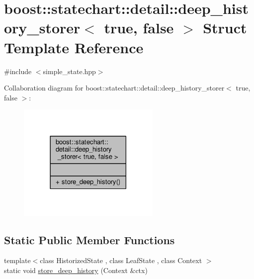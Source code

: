 \hypertarget{structboost_1_1statechart_1_1detail_1_1deep__history__storer_3_01true_00_01false_01_4}{}\section{boost\+:\+:statechart\+:\+:detail\+:\+:deep\+\_\+history\+\_\+storer$<$ true, false $>$ Struct Template Reference}
\label{structboost_1_1statechart_1_1detail_1_1deep__history__storer_3_01true_00_01false_01_4}


{\ttfamily \#include $<$simple\+\_\+state.\+hpp$>$}



Collaboration diagram for boost\+:\+:statechart\+:\+:detail\+:\+:deep\+\_\+history\+\_\+storer$<$ true, false $>$\+:
\nopagebreak
\begin{figure}[H]
\begin{center}
\leavevmode
\includegraphics[width=194pt]{structboost_1_1statechart_1_1detail_1_1deep__history__storer_3_01true_00_01false_01_4__coll__graph}
\end{center}
\end{figure}
\subsection*{Static Public Member Functions}
\begin{DoxyCompactItemize}
\item 
{\footnotesize template$<$class Historized\+State , class Leaf\+State , class Context $>$ }\\static void \mbox{\hyperlink{structboost_1_1statechart_1_1detail_1_1deep__history__storer_3_01true_00_01false_01_4_ab0a166bceb5d1f1062c9be06d8a9121b}{store\+\_\+deep\+\_\+history}} (Context \&ctx)
\end{DoxyCompactItemize}



